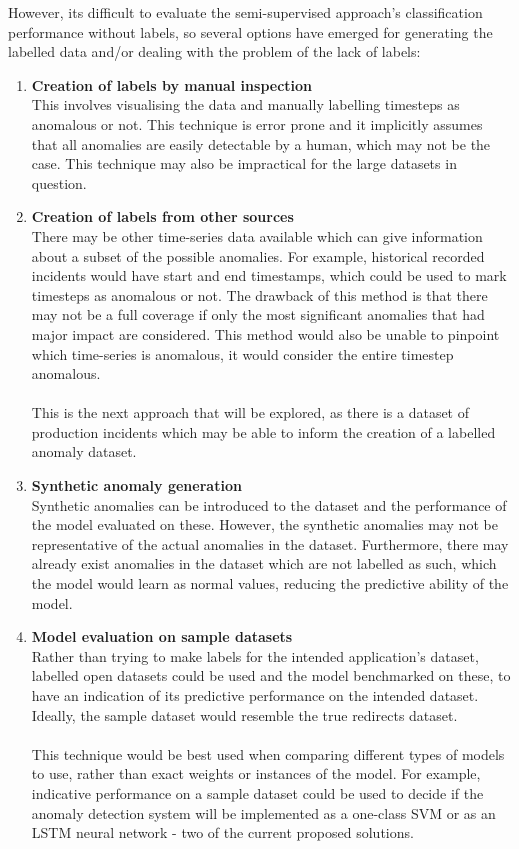\documentclass{mproj}
\begin{document}
However, its difficult to evaluate the semi-supervised approach's classification performance without labels, so several options have emerged for generating the labelled data and/or dealing with the problem of the lack of labels:
\begin{enumerate}
	\item \textbf{Creation of labels by manual inspection} \\ This involves visualising the data and manually labelling timesteps as anomalous or not. This technique is error prone and it implicitly assumes that all anomalies are easily detectable by a human, which may not be the case. This technique may also be impractical for the large datasets in question.
	\item \textbf{Creation of labels from other sources} \\ There may be other time-series data available which can give information about a subset of the possible anomalies. For example, historical recorded incidents would have start and end timestamps, which could be used to mark timesteps as anomalous or not. The drawback of this method is that there may not be a full coverage if only the most significant anomalies that had major impact are considered. This method would also be unable to pinpoint which time-series is anomalous, it would consider the entire timestep anomalous.\\\\
		This is the next approach that will be explored, as there is a dataset of production incidents which may be able to inform the creation of a labelled anomaly dataset.
	\item \textbf{Synthetic anomaly generation} \\ Synthetic anomalies can be introduced to the dataset and the performance of the model evaluated on these. However, the synthetic anomalies may not be representative of the actual anomalies in the dataset. Furthermore, there may already exist anomalies in the dataset which are not labelled as such, which the model would learn as normal values, reducing the predictive ability of the model.
	\item \textbf{Model evaluation on sample datasets} \\ Rather than trying to make labels for the intended application's dataset, labelled open datasets could be used and the model benchmarked on these, to have an indication of its predictive performance on the intended dataset. Ideally, the sample dataset would resemble the true redirects dataset.
		\\\\
		This technique would be best used when comparing different types of models to use, rather than exact weights or instances of the model. For example, indicative performance on a sample dataset could be used to decide if the anomaly detection system will be implemented as a one-class SVM or as an LSTM neural network - two of the current proposed solutions.
\end{enumerate}
\end{document}
